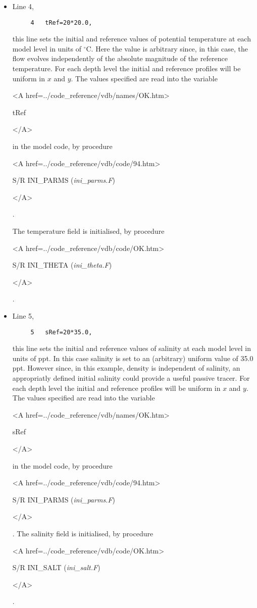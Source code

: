 \begin{itemize}

\item Line 4, 
\begin{verbatim}
     4   tRef=20*20.0,
\end{verbatim}
this line sets
the initial and reference values of potential temperature at each model
level in units of $^{\circ}$C. Here the value is arbitrary since, in this case, the 
flow evolves independently of the absolute magnitude of the reference temperature.
For each depth level the initial and reference profiles will be uniform in
$x$ and $y$. The values specified are read into the
variable 
{\bf 
\begin{rawhtml} <A href=../code_reference/vdb/names/OK.htm> \end{rawhtml}
tRef
\begin{rawhtml} </A>\end{rawhtml}
} 
in the model code, by procedure 
{\it
\begin{rawhtml} <A href=../code_reference/vdb/code/94.htm> \end{rawhtml}
S/R INI\_PARMS ({\it ini\_parms.F})
\begin{rawhtml} </A>\end{rawhtml}.
}
The temperature field is initialised, by procedure 
{\it
\begin{rawhtml} <A href=../code_reference/vdb/code/OK.htm> \end{rawhtml}
S/R INI\_THETA ({\it ini\_theta.F})
\begin{rawhtml} </A>\end{rawhtml}.
}


\item Line 5,
\begin{verbatim}
     5   sRef=20*35.0,
\end{verbatim}
this line sets the initial and reference values of salinity at each model
level in units of ppt. In this case salinity is set to an (arbitrary) uniform value of 
35.0 ppt. However since, in this example, density is independent of salinity, 
an appropriatly defined initial salinity could provide a useful passive 
tracer. For each depth level the initial and reference profiles will be uniform in
$x$ and $y$. The values specified are read into the
variable 
{\bf
\begin{rawhtml} <A href=../code_reference/vdb/names/OK.htm> \end{rawhtml}
sRef
\begin{rawhtml} </A>\end{rawhtml}
} 
in the model code, by procedure 
{\it
\begin{rawhtml} <A href=../code_reference/vdb/code/94.htm> \end{rawhtml}
S/R INI\_PARMS ({\it ini\_parms.F})
}
\begin{rawhtml} </A>\end{rawhtml}.
The salinity field is initialised, by procedure 
{\it
\begin{rawhtml} <A href=../code_reference/vdb/code/OK.htm> \end{rawhtml}
S/R INI\_SALT ({\it ini\_salt.F})
\begin{rawhtml} </A>\end{rawhtml}.
}



\end{itemize}
